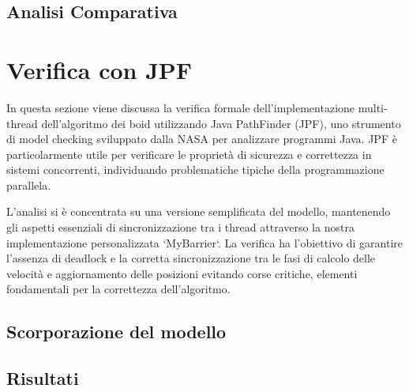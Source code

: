\documentclass[a4paper,12pt]{report}
\begin{document}
\section{Analisi Comparativa}


\chapter{Verifica con JPF}
In questa sezione viene discussa la verifica formale dell'implementazione multi-thread dell'algoritmo dei boid utilizzando Java PathFinder (JPF), uno strumento di model checking sviluppato dalla NASA per analizzare programmi Java. 
JPF è particolarmente utile per verificare le proprietà di sicurezza e correttezza in sistemi concorrenti, individuando problematiche tipiche della programmazione parallela.

L'analisi si è concentrata su una versione semplificata del modello, mantenendo gli aspetti essenziali di sincronizzazione tra i thread attraverso la nostra implementazione personalizzata `MyBarrier`. La verifica ha l'obiettivo di garantire l'assenza di deadlock e la corretta sincronizzazione tra le fasi di calcolo delle velocità e aggiornamento delle posizioni evitando corse critiche, elementi fondamentali per la correttezza dell'algoritmo.

\section{Scorporazione del modello}

\section{Risultati}
\end{document}
